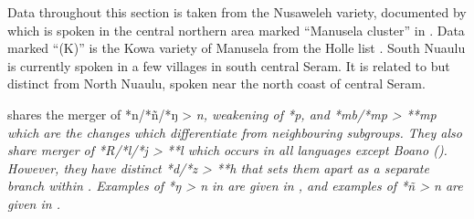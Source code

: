 Data throughout this section is taken from the Nusaweleh variety,
documented by \citet{MacDonald2015} which is spoken in the central
northern area marked “Manusela cluster” in .
Data marked “(K)” is the Kowa variety of Manusela from the Holle list \citep[185--191]{Stokhof1981a}.
South Nuaulu is currently spoken in a few villages in south central Seram.
It is related to but distinct from North Nuaulu,
spoken near the north coast of central Seram.

 shares the merger of *n/*ñ/*ŋ  > \it{n},
weakening of *p, and *mb/*mp > **mp which are the changes which
differentiate  from neighbouring subgroups.
They also share merger of *R/*l/*j > **l which occurs in all
 languages except Boano ().
However, they have distinct *d/*z > **h that sets them apart
as a separate branch within .
Examples of *ŋ > \it{n} in are given in ,
and examples of *ñ > \it{n} are given in .

